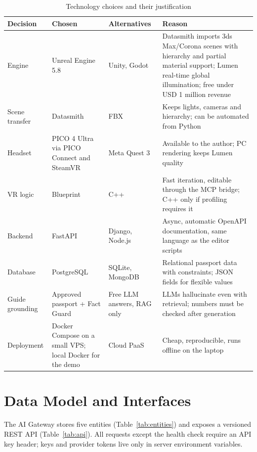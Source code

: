\begin{table}[H]
\centering
\begin{tightblock}
\footnotesize
\begin{tabularx}{\textwidth}{P{2.1cm} P{2.6cm} P{2.1cm} L}
\toprule
\textbf{Decision} & \textbf{Chosen} & \textbf{Alternatives} & \textbf{Reason} \\
\midrule
Engine & Unreal Engine 5.8 & Unity, Godot & Datasmith imports 3ds Max/Corona scenes with hierarchy and partial material support; Lumen real-time global illumination; free under USD 1 million revenue \\
Scene transfer & Datasmith & FBX & Keeps lights, cameras and hierarchy; can be automated from Python \\
Headset & PICO 4 Ultra via PICO Connect and SteamVR & Meta Quest 3 & Available to the author; PC rendering keeps Lumen quality \\
VR logic & Blueprint & C++ & Fast iteration, editable through the MCP bridge; C++ only if profiling requires it \\
Backend & FastAPI & Django, Node.js & Async, automatic OpenAPI documentation, same language as the editor scripts \\
Database & PostgreSQL & SQLite, MongoDB & Relational passport data with constraints; JSON fields for flexible values \\
Guide grounding & Approved passport + Fact Guard & Free LLM answers, RAG only & LLMs hallucinate even with retrieval; numbers must be checked after generation \\
Deployment & Docker Compose on a small VPS; local Docker for the demo & Cloud PaaS & Cheap, reproducible, runs offline on the laptop \\
\bottomrule
\end{tabularx}
\end{tightblock}
\caption{Technology choices and their justification}
\label{tab:tech}
\end{table}

\section{Data Model and Interfaces}

The AI Gateway stores five entities (Table~\ref{tab:entities}) and exposes a versioned REST API (Table~\ref{tab:api}). All requests except the health check require an API key header; keys and provider tokens live only in server environment variables.

